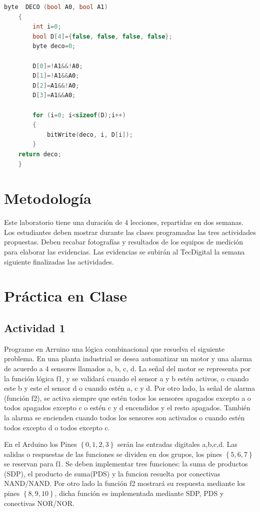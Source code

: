 \begin{lstlisting}[language=C++]
	byte  DECO (bool A0, bool A1)
	{
		int i=0;
		bool D[4]={false, false, false, false};
		byte deco=0;
	
		D[0]=!A1&&!A0;
		D[1]=!A1&&A0;
		D[2]=A1&&!A0;
		D[3]=A1&&A0;
	
		for (i=0; i<sizeof(D);i++)
		{
			bitWrite(deco, i, D[i]);
		}
	return deco;
	}
\end{lstlisting}
  
\section{Metodología}

Este laboratorio tiene una duración de 4 lecciones, repartidas en dos semanas. Los estudiantes deben mostrar durante las clases programadas las tres actividades propuestas. Deben recabar fotografías y resultados de los equipos de medición para elaborar las evidencias. Las evidencias se subirán al TecDigital la semana siguiente finalizadas las actividades.

\section{Práctica en Clase}

\subsection{Actividad 1}

Programe en Arruino una lógica combinacional que resuelva el siguiente problema.  En una planta industrial se desea automatizar un motor y una alarma de acuerdo a 4 sensores llamados a, b, c, d.  La señal del motor se representa por la función lógica f1, y se validará  cuando el sensor  a y b estén activos, o cuando  este b y  este el sensor d o cuando estén a, c y d. Por otro lado, la señal de  alarma (función f2), se activa siempre que estén todos los sensores apagados excepto a o todos apagados excepto c o  estén c y d encendidos y el resto apagados. También la alarma se encienden cuando todos los sensores son activados o cuando estén todos excepto d o todos excepto c.
 
 En el Arduino los Pines $\left\lbrace 0,1,2,3\right\rbrace $ serán las entradas digitales {a,b,c,d}. Las salidas o respuestas de las funciones se dividen en dos grupos, los pines $\left\lbrace 5,6,7\right\rbrace $ se reservan para f1. Se deben implementar tres funciones:  la suma de productos (SDP), el producto de suma(PDS) y la funcion resuelta por conectivas NAND/NAND.   Por otro lado la función f2  mostrar\'{a} su respuesta mediante los pines 
 $\left\lbrace 8,9,10\right\rbrace $, dicha función es implementada mediante SDP, PDS y conectivas NOR/NOR.
 
